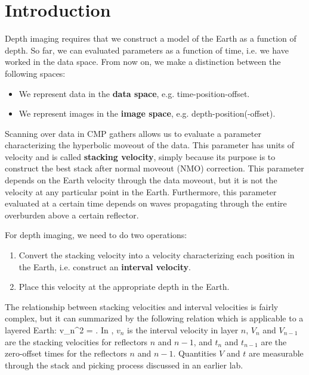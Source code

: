 \section{Introduction}

Depth imaging requires that we construct a model of the Earth as a
function of depth. So far, we can evaluated parameters as a function
of time, i.e. we have worked in the data space. From now on, we make a
distinction between the following spaces:
%
\begin{itemize}
\item We represent data in the \textbf{data space},
  e.g. time-position-offset.
\item We represent images in the \textbf{image space},
  e.g. depth-position(-offset).
\end{itemize}

Scanning over data in CMP gathers allows us to evaluate a parameter
characterizing the hyperbolic moveout of the data. This parameter has
units of velocity and is called \textbf{stacking velocity}, simply
because its purpose is to construct the best stack after normal
moveout (NMO) correction. This parameter depends on the Earth velocity
through the data moveout, but it is not the velocity at any particular
point in the Earth. Furthermore, this parameter evaluated at a certain
time depends on waves propagating through the entire overburden above
a certain reflector.

For depth imaging, we need to do two operations:
\begin{enumerate}
\item Convert the stacking velocity into a velocity characterizing
  each position in the Earth, i.e. construct an \textbf{interval
    velocity}.
\item Place this velocity at the appropriate depth in the Earth.
\end{enumerate}

The relationship between stacking velocities and interval velocities
is fairly complex, but it can summarized by the following relation
which is applicable to a layered Earth:
%
\beq \label{eqn:INT}
v_n^2 =  \;.
\eeq
%
In , $v_n$ is the interval velocity in layer $n$, $V_n$ and
$V_{n-1}$ are the stacking velocities for reflectors $n$ and $n-1$,
and $t_n$ and $t_{n-1}$ are the zero-offset times for the reflectors
$n$ and $n-1$. Quantities $V$ and $t$ are measurable through the stack
and picking process discussed in an earlier lab.

